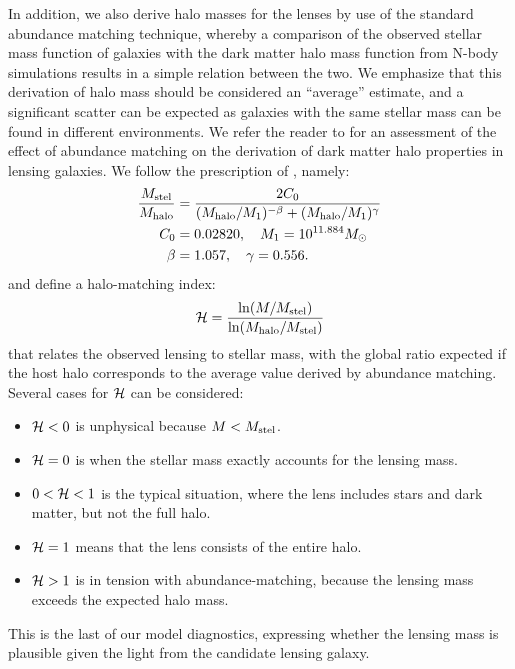 In addition, we also derive halo masses for the lenses by use of the
standard abundance matching technique, whereby a comparison of the
observed stellar mass function of galaxies with the dark matter halo
mass function from N-body simulations results in a simple relation
between the two. We emphasize that this derivation of halo mass should
be considered an ``average'' estimate, and a significant scatter can
be expected as galaxies with the same stellar mass can be found in
different environments. We refer the reader to \cite{2012MNRAS.424..104L}
for an assessment of the effect of abundance matching on the
derivation of dark matter halo properties in lensing galaxies. We
follow the prescription of \citet{2010ApJ...710..903M}, namely:
\begin{equation}
\begin{aligned}
\frac{M_\text{stel}}{M_\text{halo}} &= \frac{2C_0}{(M_\text{halo}/M_1)^{-\beta} +
                                     (M_\text{halo}/M_1)^\gamma} \\
C_0 &= 0.02820, \quad M_1 = 10^{11.884} M_\odot \\
\beta &= 1.057, \quad \gamma = 0.556.
\end{aligned}
\end{equation}
and define a halo-matching index:
\begin{equation}
\mathcal{H} = \frac{\ln(M/M_\text{stel})}{\ln(M_\text{halo}/M_\text{stel})}
\end{equation}
that relates the observed lensing to stellar mass, with the
global ratio expected if the host halo corresponds to the
average value derived by abundance matching. Several cases
for $\mathcal{H}$ can be considered:
\begin{itemize}
\item $\mathcal{H} < 0$ is unphysical because $M<M_\text{stel}$.
\item $\mathcal{H} = 0$ is when the stellar mass exactly accounts for the
  lensing mass.
\item $0 < \mathcal{H} < 1$ is the typical situation, where the lens
  includes stars and dark matter, but not the full halo.
\item $\mathcal{H} = 1$ means that the lens consists of the entire halo.
\item $\mathcal{H} > 1$ is in tension with abundance-matching, because the
  lensing mass exceeds the expected halo mass.
\end{itemize}
This is the last of our model diagnostics, expressing whether the
lensing mass is plausible given the light from the candidate lensing
galaxy.




